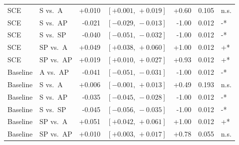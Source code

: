\begin{table}[h!]
\begin{tabular}{llrrrrl}
SCE & S vs.\ A & +0.010 & $[+0.001,\,+0.019]$ & +0.60 & 0.105 & n.s. \\
SCE & S vs.\ AP & -0.021 & $[-0.029,\,-0.013]$ & -1.00 & 0.012 & -* \\
SCE & S vs.\ SP & -0.040 & $[-0.051,\,-0.032]$ & -1.00 & 0.012 & -* \\
SCE & SP vs.\ A & +0.049 & $[+0.038,\,+0.060]$ & +1.00 & 0.012 & +* \\
SCE & SP vs.\ AP & +0.019 & $[+0.010,\,+0.027]$ & +0.93 & 0.012 & +* \\
Baseline & A vs.\ AP & -0.041 & $[-0.051,\,-0.031]$ & -1.00 & 0.012 & -* \\
Baseline & S vs.\ A & +0.006 & $[-0.001,\,+0.013]$ & +0.49 & 0.193 & n.s. \\
Baseline & S vs.\ AP & -0.035 & $[-0.045,\,-0.028]$ & -1.00 & 0.012 & -* \\
Baseline & S vs.\ SP & -0.045 & $[-0.056,\,-0.035]$ & -1.00 & 0.012 & -* \\
Baseline & SP vs.\ A & +0.051 & $[+0.042,\,+0.061]$ & +1.00 & 0.012 & +* \\
Baseline & SP vs.\ AP & +0.010 & $[+0.003,\,+0.017]$ & +0.78 & 0.055 & n.s. \\
\bottomrule
\end{tabular}
\end{table}
